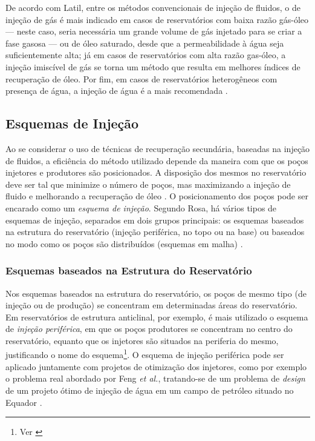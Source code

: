 De acordo com Latil, entre os m\'{e}todos convencionais de inje\c{c}\~{a}o de fluidos, o de inje\c{c}\~{a}o de g\'{a}s \'{e} mais indicado em casos de reservat\'{o}rios com baixa raz\~{a}o g\'{a}s-\'{o}leo --- neste caso, seria necess\'{a}ria um grande volume de g\'{a}s injetado para se criar a fase gasosa --- ou de \'{o}leo saturado, desde que a permeabilidade \`{a} \'{a}gua seja suficientemente alta; j\'{a} em casos de reservat\'{o}rios com alta raz\~{a}o gas-\'{o}leo, a inje\c{c}\~{a}o imisc\'{i}vel de g\'{a}s se torna um m\'{e}todo que resulta em melhores \'{i}ndices de recupera\c{c}\~{a}o de \'{o}leo. Por fim, em casos de reservat\'{o}rios heterog\^{e}neos com presen\c{c}a de \'{a}gua, a inje\c{c}\~{a}o de \'{a}gua \'{e} a mais recomendada \cite{latil}. 

\subsection{Esquemas de Inje\c{c}\~{a}o}

Ao se considerar o uso de t\'{e}cnicas de recupera\c{c}\~{a}o secund\'{a}ria, baseadas na inje\c{c}\~{a}o de fluidos, a efici\^{e}ncia do m\'{e}todo utilizado depende da maneira com que os po\c{c}os injetores e produtores s\~{a}o posicionados. A disposi\c{c}\~{a}o dos mesmos no reservat\'{o}rio deve ser tal que minimize o n\'{u}mero de po\c{c}os, mas maximizando a inje\c{c}\~{a}o de fluido e melhorando a recupera\c{c}\~{a}o de \'{o}leo \cite{dake}. O posicionamento dos po\c{c}os pode ser encarado como um \textit{esquema de inje\c{c}\~{a}o}. Segundo Rosa, h\'{a} v\'{a}rios tipos de esquemas de inje\c{c}\~{a}o, separados em dois grupos principais: os esquemas baseados na estrutura do reservat\'{o}rio (inje\c{c}\~{a}o perif\'{e}rica, no topo ou na base) ou baseados no modo como os po\c{c}os s\~{a}o distribu\'{i}dos (esquemas em malha) \cite[p. 564]{engres}.

\subsubsection{Esquemas baseados na Estrutura do Reservat\'{o}rio}
Nos esquemas baseados na estrutura do reservat\'{o}rio, os po\c{c}os de mesmo tipo (de inje\c{c}\~{a}o ou de produ\c{c}\~{a}o) se concentram em determinadas \'{a}reas do reservat\'{o}rio. Em reservat\'{o}rios de estrutura anticlinal, por exemplo, \'{e} mais utilizado o esquema de \textit{inje\c{c}\~{a}o perif\'{e}rica}, em que os po\c{c}os produtores se concentram no centro do reservat\'{o}rio, equanto que os injetores s\~{a}o situados na periferia do mesmo, justificando o nome do esquema\footnote{Ver \cite[p. 565]{engres}}. O esquema de inje\c{c}\~{a}o perif\'{e}rica pode ser aplicado juntamente com projetos de otimiza\c{c}\~{a}o dos injetores, como por exemplo o problema real abordado por Feng \textit{et al.}, tratando-se de um problema de \textit{design} de um projeto \'{o}timo de inje\c{c}\~{a}o de \'{a}gua em um campo de petr\'{o}leo situado no Equador \cite{feng2015}. 

